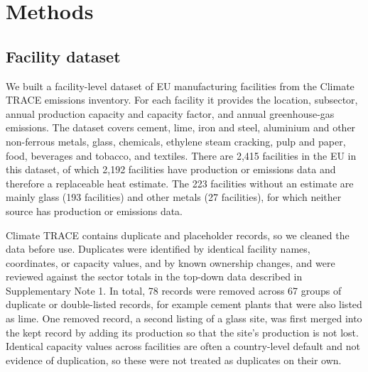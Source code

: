 \documentclass[11pt]{article}
\begin{document}
\section*{Methods}

\subsection*{Facility dataset}
We built a facility-level dataset of EU manufacturing facilities from the Climate TRACE emissions inventory\cite{climatetrace2026}. For each facility it provides the location, subsector, annual production capacity and capacity factor, and annual greenhouse-gas emissions. The dataset covers cement, lime, iron and steel, aluminium and other non-ferrous metals, glass, chemicals, ethylene steam cracking, pulp and paper, food, beverages and tobacco, and textiles. There are 2,415 facilities in the EU in this dataset, of which 2,192 facilities have production or emissions data and therefore a replaceable heat estimate. The 223 facilities without an estimate are mainly glass (193 facilities) and other metals (27 facilities), for which neither source has production or emissions data.

Climate TRACE contains duplicate and placeholder records, so we cleaned the data before use. Duplicates were identified by identical facility names, coordinates, or capacity values, and by known ownership changes, and were reviewed against the sector totals in the top-down data described in Supplementary Note 1. In total, 78 records were removed across 67 groups of duplicate or double-listed records, for example cement plants that were also listed as lime. One removed record, a second listing of a glass site, was first merged into the kept record by adding its production so that the site's production is not lost. Identical capacity values across facilities are often a country-level default and not evidence of duplication, so these were not treated as duplicates on their own.
\end{document}
